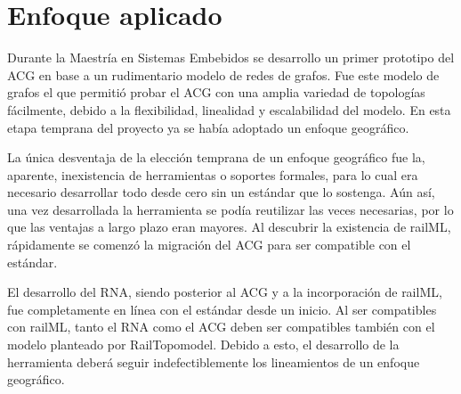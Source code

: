 \section{Enfoque aplicado}

    Durante la Maestría en Sistemas Embebidos se desarrollo un primer prototipo del ACG en base a un rudimentario modelo de redes de grafos. Fue este modelo de grafos el que permitió probar el ACG con una amplia variedad de topologías fácilmente, debido a la flexibilidad, linealidad y escalabilidad del modelo. En esta etapa temprana del proyecto ya se había adoptado un enfoque geográfico.

    La única desventaja de la elección temprana de un enfoque geográfico fue la, aparente, inexistencia de herramientas o soportes formales, para lo cual era necesario desarrollar todo desde cero sin un estándar que lo sostenga. Aún así, una vez desarrollada la herramienta se podía reutilizar las veces necesarias, por lo que las ventajas a largo plazo eran mayores. Al descubrir la existencia de railML, rápidamente se comenzó la migración del ACG para ser compatible con el estándar.

    El desarrollo del RNA, siendo posterior al ACG y a la incorporación de railML, fue completamente en línea con el estándar desde un inicio. Al ser compatibles con railML, tanto el RNA como el ACG deben ser compatibles también con el modelo planteado por RailTopomodel. Debido a esto, el desarrollo de la herramienta deberá seguir indefectiblemente los lineamientos de un enfoque geográfico. 